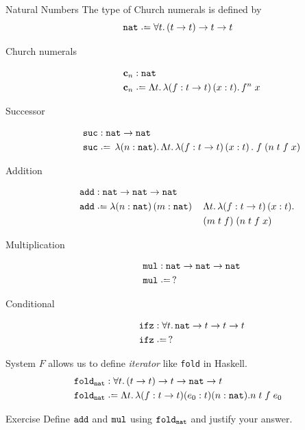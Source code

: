 \begin{frame}[allowframebreaks]{Natural Numbers}
The type of Church numerals is defined by 
\[
  \nat \defeq \forall t.\, (t\to t)\to t\to t
\]
  \begin{description}
    \item[Church numerals]
      \begin{align*}
        \bc_n & : \nat \\
        \bc_n & \defeq \Lambda t.\,\lambda (f:t \to t)\,(x:t).\,
        f^n\;x
      \end{align*}
    \item[Successor]
      \begin{align*}
        \suc & : \nat \to \nat \\
        \suc & \defeq \,\lambda (n : \nat).\,\Lambda t.\,\lambda
        (f : t \to t)\,(x:t)\,.\;f\;(n\;t\;f\;x) 
      \end{align*}
    \item[Addition]
      \begin{align*}
        \add & : \nat \to \nat \to \nat \\
        \add & \defeq \lambda (n : \nat)\,(m:\nat)\,&& \Lambda t.\, \lambda
        (f:t\to t)\,(x: t).\\
        &&& (m\;t\;f)\;(n\;t\;f\;x) 
      \end{align*}
    \item[Multiplication] 
      \begin{align*}
       \mul & : \nat\to \nat \to\nat\\
       \mul & \defeq\,?
      \end{align*}
    \item[Conditional]
      \begin{align*}
       \ifz & : \forall t.\,\nat \to t \to t \to t \\
       \ifz & \defeq\,?
      \end{align*}
  \end{description}
System $F$ allows us to define \emph{iterator} like \texttt{fold} in Haskell.
\begin{align*}
  \mathtt{fold}_{\nat} & : \forall t.\, (t \to t) \to t \to \nat \to t  \\
  \mathtt{fold}_{\nat} & \defeq \Lambda t.\, \lambda (f : t \to t)(e_0 : t)(n : \nat). 
  n\;t\;f\;e_0
\end{align*}

%
%
%
\begin{block}{Exercise}
  Define $\mathtt{add}$ and $\mathtt{mul}$ using $\mathtt{fold}_{\mathtt{nat}}$ and justify your
  answer.
  

\end{block}
\end{frame}
